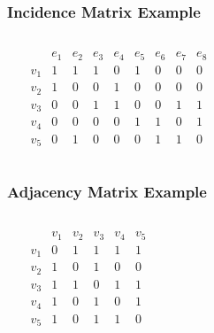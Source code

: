 \documentclass[dvipsnames]{beamer}
\begin{document}
\begin{frame}
  \frametitle{Incidence Matrix Example}

  \begin{example}
    \begin{columns}
      \begin{center}
      \end{center}

      \[
        \begin{array}{c|cccccccc}
              & e_1 & e_2 & e_3 & e_4 & e_5 & e_6 & e_7 & e_8\\\hline
          v_1 & 1 & 1 & 1 & 0 & 1 & 0 & 0 & 0\\
          v_2 & 1 & 0 & 0 & 1 & 0 & 0 & 0 & 0\\
          v_3 & 0 & 0 & 1 & 1 & 0 & 0 & 1 & 1\\
          v_4 & 0 & 0 & 0 & 0 & 1 & 1 & 0 & 1\\
          v_5 & 0 & 1 & 0 & 0 & 0 & 1 & 1 & 0
        \end{array}
      \]
    \end{columns}
  \end{example}
\end{frame}

\begin{frame}
  \frametitle{Adjacency Matrix Example}

  \begin{example}
    \begin{columns}
      \begin{center}
      \end{center}

      \[
        \begin{array}{c|ccccc}
                & v_1 & v_2 & v_3 & v_4 & v_5\\\hline
            v_1 & 0 & 1 & 1 & 1 & 1\\
            v_2 & 1 & 0 & 1 & 0 & 0\\
            v_3 & 1 & 1 & 0 & 1 & 1\\
            v_4 & 1 & 0 & 1 & 0 & 1\\
            v_5 & 1 & 0 & 1 & 1 & 0
        \end{array}
      \]
    \end{columns}
  \end{example}
\end{frame}
\end{document}
